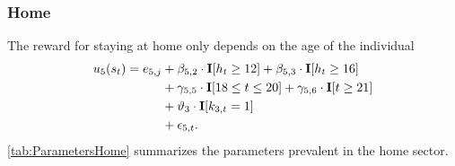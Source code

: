 \FloatBarrier\subsubsection{Home}
The reward for staying at home only depends on the age of the individual
%
\begin{align}
    u_5(s_t) =  e_{5,j} & + \beta_{5,2} \cdot {\textbf{I}}[h_t \geq 12] + \beta_{5,3} \cdot {\textbf{I}}[h_t \geq 16] 			 \nonumber \\
    							   & + \gamma_{5,5} \cdot {\textbf{I}}[18 \leq t \leq 20] + \gamma_{5,6} \cdot {\textbf{I}}[t \geq 21] \nonumber \\
    							   & + \vartheta_3 \cdot {\textbf{I}}[k_{3,t} = 1]  \nonumber \\
    							   & + \epsilon_{5,t}.
\end{align}
%
\autoref{tab:ParametersHome} summarizes the parameters prevalent in the home sector.


